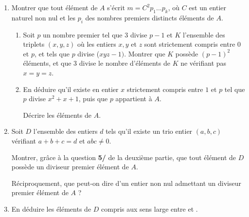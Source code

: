 \begin{enumerate}
\begin{enumerate}
Montrer que $n_0$ divise l'entier non nul $u_1^2+3v_1^2$ que
l'on notera $n_0n_1$.
		\item En déduire qu'un tel entier $m$ ne peut pas exister (on pourra
considérer l'entier $n_0^2n_1p$).
	\end{enumerate}
\item Montrer que tout élément de $A$ s'écrit $m = C^2p_1...p_k$, où
$C$ est un entier naturel non nul et les $p_i$ des nombres premiers
distincts éléments de $A$.
	\begin{enumerate}
		\item Soit $p$ un nombre premier tel que $3$ divise $p-1$ et $K$ l'ensemble
des triplets $(x, y, z)$ où les entiers $x, y$ et $z$ sont strictement compris
entre $0$ et $p$, et tels que $p$ divise ($xyz - 1)$. Montrer que $K$
possède $(p-1)^2$ éléments, et que $3$ divise le nombre d'éléments de $K$
ne vérifiant pas $x=y=z$.
		\item En déduire qu'il existe en entier $x$ strictement compris entre $1$
et $p$ tel que $p$ divise $x^2+x+1$, puis que $p$ appartient à $A$.

Décrire les éléments de $A$.
	\end{enumerate}
\item Soit $D$ l'ensemble des entiers $d$ tels qu'il existe un trio entier
$(a, b, c)$ vérifiant $a + b + c= d$ et $abc\not=0$.

Montrer, grâce à la question \textbf{5/} de la deuxième partie, que tout élément de $D$ possède un diviseur premier élément de $A$.

Réciproquement, que peut-on dire d'un entier non nul admettant un diviseur premier élément de $A$ ?
\item En déduire les éléments de $D$ compris aux sens large entre  et
.
\end{enumerate}
